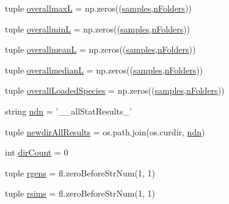 \begin{DoxyCompactItemize}
\item 
tuple \hyperlink{namespacegeneral_statistics_a611c6d1d277f96f931197de89b125c88}{overallmax\-L} = np.\-zeros((\hyperlink{namespacegeneral_statistics_a0f3c6fa133cfbef06ffd82dfbef8ace4}{samples},\hyperlink{namespacegeneral_statistics_ad418d91181efd01508f2b136166cd854}{n\-Folders}))
\item 
tuple \hyperlink{namespacegeneral_statistics_acfe28cce0c9a412ed8f1fa674038556e}{overallmin\-L} = np.\-zeros((\hyperlink{namespacegeneral_statistics_a0f3c6fa133cfbef06ffd82dfbef8ace4}{samples},\hyperlink{namespacegeneral_statistics_ad418d91181efd01508f2b136166cd854}{n\-Folders}))
\item 
tuple \hyperlink{namespacegeneral_statistics_aa01431c8721236c3a11784408d939414}{overallmean\-L} = np.\-zeros((\hyperlink{namespacegeneral_statistics_a0f3c6fa133cfbef06ffd82dfbef8ace4}{samples},\hyperlink{namespacegeneral_statistics_ad418d91181efd01508f2b136166cd854}{n\-Folders}))
\item 
tuple \hyperlink{namespacegeneral_statistics_a1d0f3d0b25c12aa4a05ab9f543edf8c7}{overallmedian\-L} = np.\-zeros((\hyperlink{namespacegeneral_statistics_a0f3c6fa133cfbef06ffd82dfbef8ace4}{samples},\hyperlink{namespacegeneral_statistics_ad418d91181efd01508f2b136166cd854}{n\-Folders}))
\item 
tuple \hyperlink{namespacegeneral_statistics_ada024998af2caa201a94d7a571747842}{overall\-Loaded\-Species} = np.\-zeros((\hyperlink{namespacegeneral_statistics_a0f3c6fa133cfbef06ffd82dfbef8ace4}{samples},\hyperlink{namespacegeneral_statistics_ad418d91181efd01508f2b136166cd854}{n\-Folders}))
\item 
string \hyperlink{namespacegeneral_statistics_aab80dabdb4bf7e3d9600c16118a88f98}{ndn} = '\-\_\-\_\-all\-Stat\-Results\-\_\-'
\item 
tuple \hyperlink{namespacegeneral_statistics_a467e98804f050cc4600b0705a664fea1}{newdir\-All\-Results} = os.\-path.\-join(os.\-curdir, \hyperlink{namespacegeneral_statistics_aab80dabdb4bf7e3d9600c16118a88f98}{ndn})
\item 
int \hyperlink{namespacegeneral_statistics_a5193f44043d24342fab95fb5d704a20f}{dir\-Count} = 0
\item 
tuple \hyperlink{namespacegeneral_statistics_aae4999d25c34936e487c12f7b967e638}{rgens} = fl.\-zero\-Before\-Str\-Num(1, 1)
\item 
tuple \hyperlink{namespacegeneral_statistics_a67c2e718220e1b11a31ed770b5a97f94}{rsims} = fl.\-zero\-Before\-Str\-Num(1, 1)
\item 

\end{DoxyCompactItemize}
